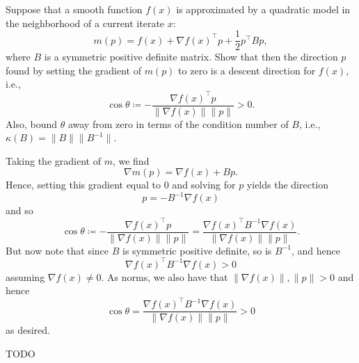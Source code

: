 \documentclass{../kin_math}
\begin{document}
\begin{questions}
  \question Suppose that a smooth function $f(x)$ is approximated by a quadratic model in the neighborhood of a current iterate $x$:
  \begin{equation*}
    m(p) = f(x) + \nabla f(x)^\top p + \frac{1}{2} p^\top B p,
  \end{equation*}
  where $B$ is a symmetric positive definite matrix. Show that then the direction $p$ found by setting the gradient of $m(p)$ to zero is a descent direction for $f(x)$, i.e.,
  \begin{equation*}
    \cos \theta \coloneqq - \frac{\nabla f(x)^\top p}{\lVert \nabla f(x) \rVert \lVert p \rVert} > 0.
  \end{equation*}
  Also, bound $\theta$ away from zero in terms of the condition number of $B$, i.e., $\kappa(B) = \lVert B \rVert \lVert B^{-1} \rVert$.
  \begin{solution}
    Taking the gradient of $m$, we find
    \begin{equation*}
      \nabla m(p) = \nabla f(x) + B p.
    \end{equation*}
    Hence, setting this gradient equal to 0 and solving for $p$ yields the direction
    \begin{equation*}
      p = -B^{-1} \nabla f(x)
    \end{equation*}
    and so
    \begin{equation*}
      \cos \theta \coloneqq - \frac{\nabla f(x)^\top p}{\lVert \nabla f(x) \rVert \lVert p \rVert} = \frac{\nabla f(x)^\top B^{-1} \nabla f(x)}{\lVert \nabla f(x) \rVert \lVert p \rVert}.
    \end{equation*}
    But now note that since $B$ is symmetric positive definite, so is $B^{-1}$, and hence
    \begin{equation*}
      \nabla f(x)^\top B^{-1} \nabla f(x) > 0
    \end{equation*}
    assuming $\nabla f(x) \neq 0$. As norms, we also have that $\lVert \nabla f(x) \rVert, \lVert p \rVert > 0$ and hence
    \begin{equation*}
      \cos \theta = \frac{\nabla f(x)^\top B^{-1} \nabla f(x)}{\lVert \nabla f(x) \rVert \lVert p \rVert} > 0
    \end{equation*}
    as desired.

    TODO
  \end{solution}


\end{questions}
\end{document}
